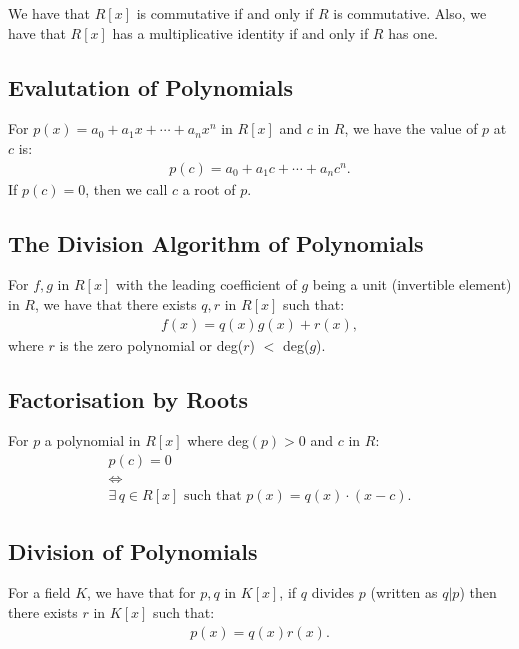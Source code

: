 \documentclass[a4paper, 12pt, twoside]{article}
\begin{document}
We have that $R[x]$ is commutative if and only if $R$ is commutative.
Also, we have that $R[x]$ has a multiplicative identity if and only
if $R$ has one.

\subsection{Evalutation of Polynomials}

For $p(x) = a_0 + a_1x + \cdots + a_nx^n$ in $R[x]$ and $c$ in $R$, we have
the value of $p$ at $c$ is: \begin{gather*}
  p(c) = a_0 + a_1c + \cdots + a_nc^n.
\end{gather*} If $p(c) = 0$, then we call $c$ a root of $p$.

\subsection{The Division Algorithm of Polynomials}

For $f, g$ in $R[x]$ with the leading coefficient of $g$ being a unit (invertible
element) in $R$, we have that there exists $q, r$ in $R[x]$ such that: \begin{gather*}
  f(x) = q(x)g(x) + r(x),
\end{gather*} where $r$ is the zero polynomial or deg($r$) $<$ deg($g$).

\subsection{Factorisation by Roots}

For $p$ a polynomial in $R[x]$ where deg$(p) > 0$ and $c$ in $R$: \begin{gather*}
  p(c) = 0 \\ 
  \Longleftrightarrow \\
  \exists \, q \in R[x] \text{ such that } p(x) = q(x) \cdot (x - c).
\end{gather*}  

\subsection{Division of Polynomials}

For a field $K$, we have that for $p, q$ in $K[x]$, if $q$ divides $p$ (written as $q | p$)
then there exists $r$ in $K[x]$ such that: \begin{gather*}
  p(x) = q(x)r(x).
\end{gather*}
\end{document}
